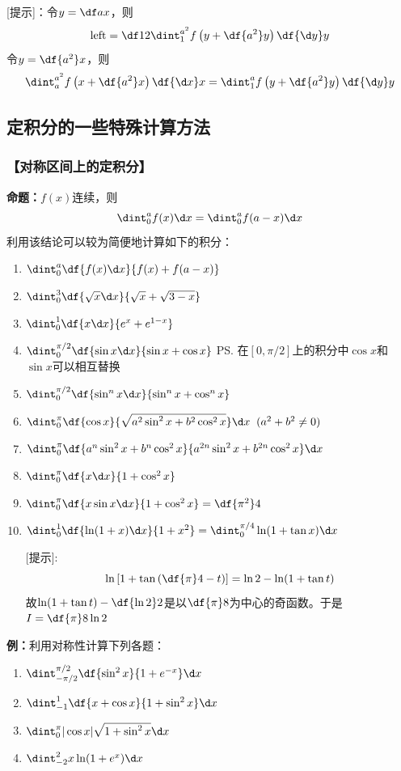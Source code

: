 [提示]：令$y=\df ax$，则
$$\mbox{left}=\df12\dint_1^{a^2}f\left(y+\df{a^2}y\right)\df{\d y}y$$
令$y=\df{a^2}x$，则
$$\dint_a^{a^2}f\left(x+\df{a^2}x\right)\df{\d x}x
=\dint_1^af\left(y+\df{a^2}y\right)\df{\d y}y$$

\subsection{定积分的一些特殊计算方法}

\subsubsection{【对称区间上的定积分】}

{\bf 命题：}$f(x)$连续，则
$$\dint_0^af(x)\d x=\dint_0^af(a-x)\d x$$
利用该结论可以较为简便地计算如下的积分：
\begin{enumerate}[(1)]
  \setlength{\itemindent}{1cm}
  \item $\dint_0^a\df{f(x)\d x}{f(x)+f(a-x)}$
  \item $\dint_0^3\df{\sqrt x\d x}{\sqrt x+\sqrt{3-x}}$
  \item $\dint_0^1\df{x\d x}{e^x+e^{1-x}}$
  \item $\dint_0^{\pi/2}\df{\sin x\d x}{\sin x+\cos x}$
  \ps{在$[0,\pi/2]$上的积分中$\cos x$和$\sin x$可以相互替换}
  \item $\dint_0^{\pi/2}\df{\sin^nx\d x}{\sin^nx+\cos^nx}$
  \item $\dint_0^{\pi}\df{\cos x}{\sqrt{a^2\sin^2x+b^2\cos^2x}}\d
  x\;\;(a^2+b^2\ne 0)$
  \item $\dint_0^{\pi}\df{a^n\sin^2x+b^n\cos^2x}
  {a^{2n}\sin^2x+b^{2n}\cos^2x}\d x$
  \item $\dint_0^{\pi}\df{x\d x}{1+\cos^2x}$
  \item $\dint_0^{\pi}\df{x\sin x\d x}{1+\cos^2x}=\df{\pi^2}4$
  \item $\dint_0^1\df{\ln(1+x)\d x}{1+x^2}=\dint_0^{\pi/4}\ln(1+\tan x)\d x$
  
  [提示]:
  $$\ln\left[1+\tan\left(\df{\pi}4-t\right)\right]=\ln2-\ln(1+\tan t)$$
  故$\ln(1+\tan t)-\df{\ln2}2$是以$\df{\pi}8$为中心的奇函数。于是$I=\df{\pi}8\ln2$
\end{enumerate}

{\bf 例：}利用对称性计算下列各题：
\begin{enumerate}[(1)]
  \setlength{\itemindent}{1cm}
  \item $\dint_{-\pi/2}^{\pi/2}\df{\sin^2x}{1+e^{-x}}\d x$
  \item $\dint_{-1}^1\df{x+\cos x}{1+\sin^2x}\d x$
  \item $\dint_{0}^{\pi}|\cos x|\sqrt{1+\sin^2x}\d x$
  \item $\dint_{-2}^2x\ln(1+e^x)\d x$
\end{enumerate}

